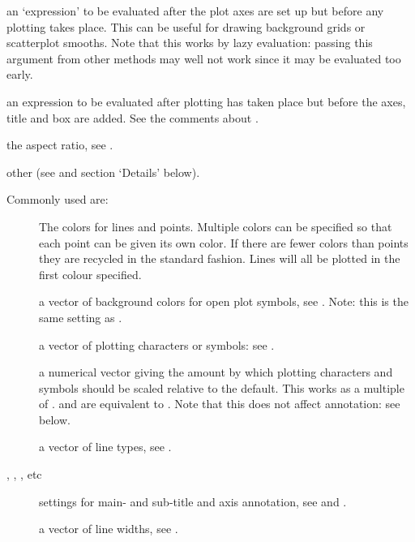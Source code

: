 \begin{Arguments}
\begin{ldescription}
\item[\code{panel.first}] an `expression' to be evaluated after the
plot axes are set up but before any plotting takes place.  This can
be useful for drawing background grids or scatterplot smooths.  Note
that this works by lazy evaluation: passing this argument from other
 methods may well not work since it may be evaluated too
early.

\item[\code{panel.last}] an expression to be evaluated after plotting has
taken place but before the axes, title and box are added.  See the
comments about .

\item[\code{asp}] the  aspect ratio, see .
\item[\code{...}] other  (see  and
section `Details' below).
\end{ldescription}
\end{Arguments}
%
\begin{Details}\relax
Commonly used  are:
\begin{description}

\item[] The colors for lines and points.  Multiple colors can be
specified so that each point can be given its own color.  If there
are fewer colors than points they are recycled in the standard
fashion.  Lines will all be plotted in the first colour specified.
\item[] a vector of background colors for open plot symbols, see
.  Note: this is  the same setting
as .
\item[] a vector of plotting characters or symbols:
see .
\item[] a numerical vector giving the amount by which
plotting characters and symbols should be scaled relative to the
default.  This works as a multiple of .
 and  are equivalent to .  Note that
this does not affect annotation: see below.
\item[] a vector of line types, see .
\item[, , ,
etc] settings for main- and sub-title and axis annotation, see
 and .
\item[] a vector of line widths, see .

\end{description}

\end{Details}

